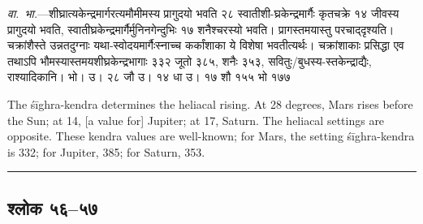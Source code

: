 \documentclass[11pt,a4paper]{article}
\newcommand{\longline}{\noindent\rule{\textwidth}{0.4pt}}
\newcommand{\dev}[1]{{\devanagarifont #1}}
\newcommand{\sectsep}{\par\vspace{0.8em}\longline\vspace{0.8em}}
\begin{document}
\vspace{0.5em}
\begin{minipage}[t]{0.48\textwidth}
\small\devanagarifont
\textit{वा.~भा.}---शीघ्रात्यकेन्‍द्रमार्गरत्यमौमीमस्य प्रागुदयो भवति २८ स्वातीशी-घ्रकेन्‍द्रमार्गैः कृतचक्रे १४ जीवस्य प्रागुदयो भवति, स्वातीघ्रकेन्‍द्रमार्गैर्मुनिनगेन्‍दुभिः १७ शनैश्चरस्यो भवति। प्रागस्तमयास्तु परचाद्‌दृश्यति। चक्रांशैस्ते उन्नतदुग्नाः यथा-स्वोदयमार्गैःस्नाच्च कर्कांशाका ये विशेषा भवतीत्यर्थः। चक्रांशाकाः प्रसिद्धा एव तथाऽपि भौमस्यास्तमयशीघ्रकेन्‍द्रभागाः ३३२ जूतो ३८५, शनैः ३५३, सवितुः/बुधस्य-स्तकेन्‍द्राद्यैः, राश्यादिकानि। भो। उ। २८ जौ उ। १४ धा उ। १७ शौ १५५ भो १७७
\end{minipage}%
\hfill
\begin{minipage}[t]{0.48\textwidth}
\small
The \'s\=ighra-kendra determines the heliacal rising. At 28 degrees, Mars rises before the Sun; at 14, [a value for] Jupiter; at 17, Saturn. The heliacal settings are opposite. These kendra values are well-known; for Mars, the setting \'s\=ighra-kendra is 332; for Jupiter, 385; for Saturn, 353.
\end{minipage}

\sectsep

\subsection{\dev{श्लोक ५६--५७}}
\end{document}
